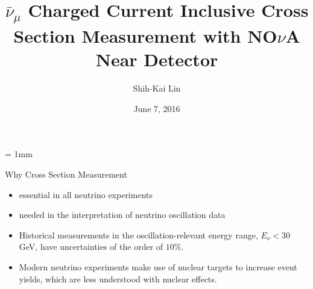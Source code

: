 \documentclass{beamer}
\author{Shih-Kai Lin}
\institute[UM]{Colorado State University}
\title{\texorpdfstring{$\bar{\nu}_\mu$}{numubar} Charged Current Inclusive Cross Section Measurement with NO$\nu$A Near Detector}
\date{June 7, 2016}
\begin{document}
  \unitlength = 1mm
\begin{frame}
\titlepage
\end{frame}

\begin{frame}{Why Cross Section Measurement}
\begin{itemize}
\item essential in all neutrino experiments
\item needed in the interpretation of neutrino oscillation data
\item Historical measurements in the oscillation-relevant energy range, $E_\nu<30$ GeV, have uncertainties of the order of $10\%$.
\item Modern neutrino experiments make use of nuclear targets to increase event yields, which are less understood with nuclear effects.
\end{itemize}
\end{frame}
\end{document}
